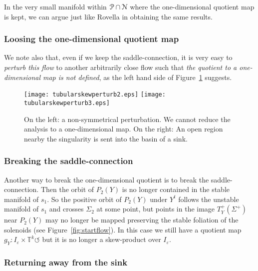 \documentclass[reqno,12pt,a4paper]{amsart}
\theoremstyle{plain}
\theoremstyle{definition}
\begin{document}
In the very small manifold within ${\EuScript{P}}\cap{\EuScript{N}}$ where the
one-dimensional quotient map is kept, we can argue just like
Rovella in \cite{Ro93} obtaining the same results.

\subsubsection{Loosing the one-dimensional quotient map}
\label{sec:non-symmetr-unfold}

We note also that, even if we keep the saddle-connection, it
is very easy to \emph{perturb this flow} to another
arbitrarily close flow such that \emph{the quotient to a
  one-dimensional map is not defined}, as the left hand side
of Figure~\ref{fig:skewperturb} suggests.

\begin{figure}[htpb]
  \centering
  \texttt{[image: tubularskewperturb2.eps]}
  \hspace{1cm}
  \texttt{[image: tubularskewperturb3.eps]}
  \caption{\label{fig:skewperturb} On the left: a
    non-symmetrical perturbation. We cannot reduce the
    analysis to a one-dimensional map. On the right: An open
    region nearby the singularity is sent into the basin of
    a sink. }
\end{figure}

\subsubsection{Breaking the saddle-connection}
\label{sec:breaking-saddle-conn}

Another way to break the one-dimensional quotient is to
break the saddle-connection. Then the orbit of $P_2(Y)$ is
no longer contained in the stable manifold of $s_1$. So the
positive orbit of $P_2(Y)$ under $Y^t$ follows the unstable
manifold of $s_1$ and crosses $\Sigma_2$ at some point, but
points in the image $T^+_Y(\Sigma^+)$ near $P_2(Y)$ may no
longer be mapped preserving the stable foliation of the
solenoids (see Figure~\ref{fig:startflow}).
In this case we still have a quotient map
$g_Y:I_{\varepsilon}\times{{\mathbb T}}^k\circlearrowleft$ but it is no longer a
skew-product over $I_{\varepsilon}$.

\subsubsection{Returning away from the sink}
\label{sec:return-away-from}
\end{document}
